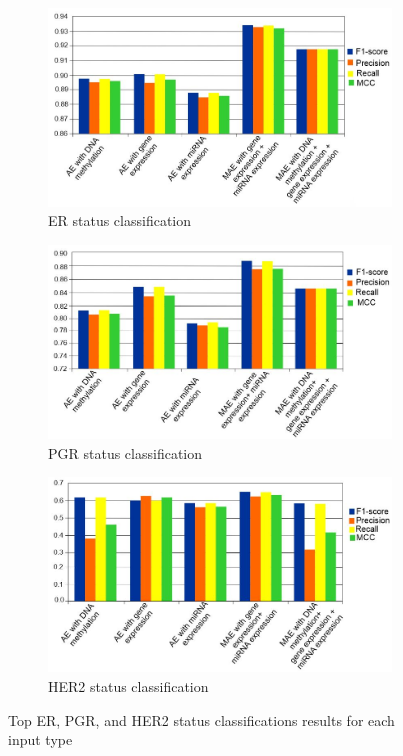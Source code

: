 \begin{figure}
	\centering
	\begin{subfigure}{.49\linewidth}
		\centering
		\includegraphics[scale=0.8]{images/1.png}
		\caption{ER status classification}
        \label{fig:top_er}
	\end{subfigure}
	\begin{subfigure}{.49\linewidth}
		\centering
		\includegraphics[scale=0.8]{images/2.png}
		\caption{PGR status classification}
        \label{fig:top_pgr}
	\end{subfigure}
	\begin{subfigure}{0.49\linewidth}
		\centering
		\includegraphics[scale=0.8]{images/3.png}
		\caption{HER2 status classification }
        \label{fig:top_her2}
	\end{subfigure}
	\caption{Top ER, PGR, and HER2 status classifications results for each input type~\cite{karimACCESS2019}} 
	\label{fig6}
		\vspace{-2mm} 
\end{figure}

